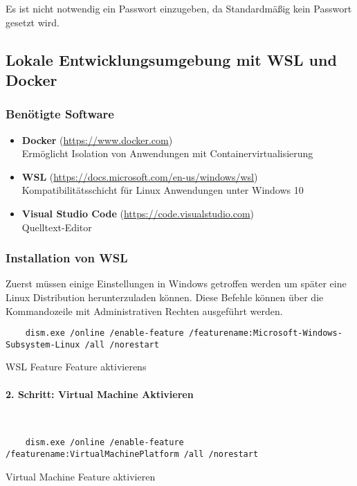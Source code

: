 Es ist nicht notwendig ein Passwort einzugeben, da Standardmäßig kein Passwort
gesetzt wird.


\subsection{Lokale Entwicklungsumgebung mit WSL und Docker}


\subsubsection{Benötigte Software}

\begin{itemize}
  \item \textbf{Docker} (\url{https://www.docker.com}) \\ Ermöglicht Isolation
        von Anwendungen mit Containervirtualisierung
  \item \textbf{WSL} (\url{https://docs.microsoft.com/en-us/windows/wsl}) \\
        Kompatibilitätsschicht für Linux Anwendungen unter Windows 10
  \item \textbf{Visual Studio Code} (\url{https://code.visualstudio.com}) \\
        Quelltext-Editor
\end{itemize}


\subsubsection{Installation von WSL}
Zuerst müssen einige Einstellungen in Windows getroffen werden um später eine
Linux Distribution herunterzuladen können. Diese Befehle können über die
Kommandozeile mit Administrativen Rechten ausgeführt werden.

\begin{listing}[H]
  \begin{verbatim}
    dism.exe /online /enable-feature /featurename:Microsoft-Windows-Subsystem-Linux /all /norestart
  \end{verbatim}
  \caption{WSL Feature Feature aktivierens}
\end{listing}

\paragraph{2. Schritt: Virtual Machine Aktivieren}\mbox{}\\
\begin{listing}[H]
  \begin{verbatim}
    dism.exe /online /enable-feature /featurename:VirtualMachinePlatform /all /norestart
  \end{verbatim}
  \caption{Virtual Machine Feature aktivieren}
\end{listing}

